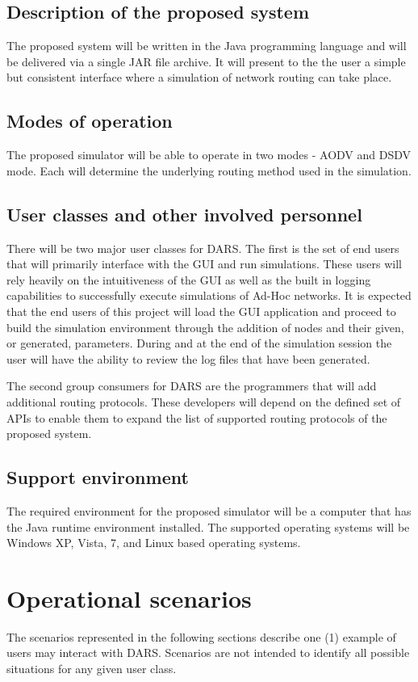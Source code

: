 \documentclass[a4paper,11pt,titlepage]{article}
\begin{document}
\subsection{Description of the proposed system}
The proposed system will be written in the Java programming language and will be delivered via a single JAR file archive. It will present to the the user a simple but consistent interface where a simulation of network routing can take place. 
 
\subsection{Modes of operation}
The proposed simulator will be able to operate in two modes - AODV and DSDV mode. Each will determine the underlying routing method used in the simulation. 
 
\subsection{User classes and other involved personnel}
There will be two major user classes for DARS.  The first is the set of end users that will primarily interface with the GUI and run simulations.  These users will rely heavily on the intuitiveness of the GUI as well as the built in logging capabilities to successfully execute simulations of Ad-Hoc networks.  It is expected that the end users of this project will load the GUI application and proceed to build the simulation environment through the addition of nodes and their given, or generated, parameters.  During and at the end of the simulation session the user will have the ability to review the log files that have been generated.
 
The second group consumers for DARS are the programmers that will add additional routing protocols.  These developers will depend on the defined set of APIs to enable them to expand the list of supported routing protocols of the proposed system.
 
\subsection{Support environment}
The required environment for the proposed simulator will be a computer that has the Java runtime environment installed. The supported operating systems will be Windows XP, Vista, 7, and Linux based operating systems.
 
\section{Operational scenarios}
The scenarios represented in the following sections describe one (1) example of users may interact with DARS. Scenarios are not intended to identify all possible situations for any given user class. 
 
\end{document}
